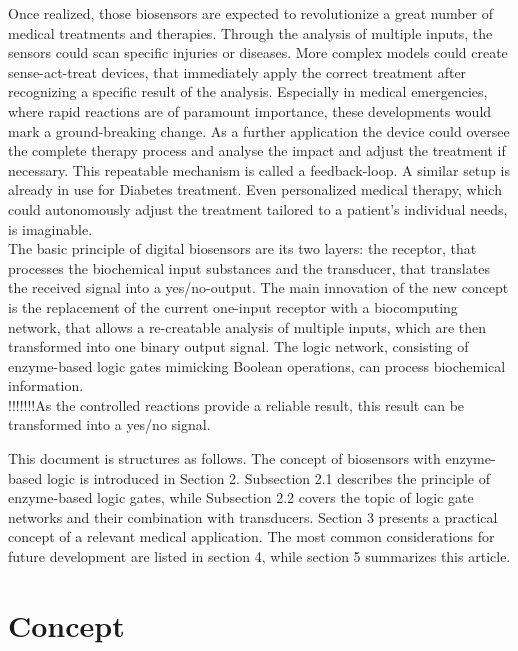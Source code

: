 \documentclass[runningheads]{llncs}
\begin{document}
	Once realized, those biosensors are expected to revolutionize a great number of medical treatments and therapies. Through the analysis of multiple inputs, the sensors could scan specific injuries or diseases. More complex models could create sense-act-treat devices, that immediately apply the correct treatment after recognizing a specific result of the analysis. Especially in medical emergencies, where rapid reactions are of paramount importance, these developments would mark a ground-breaking change. As a further application the device could oversee the complete therapy process and analyse the impact and adjust the treatment if necessary. This repeatable mechanism is called a feedback-loop. A similar setup is already in use for Diabetes treatment. Even personalized medical therapy, which could autonomously adjust the treatment tailored to a patient’s individual needs, is imaginable.\cite{original}\\
	
	The basic principle of digital biosensors are its two layers: the receptor, that processes the biochemical input substances and the transducer, that translates the received signal into a yes/no-output. The main innovation of the new concept is the replacement of the current one-input receptor with a biocomputing network, that allows a re-creatable analysis of multiple inputs, which are then transformed into one binary output signal. The logic network, consisting of enzyme-based logic gates mimicking Boolean operations, can process biochemical information.\cite{state of the art}\\ 
	 
	!!!!!!!As the controlled reactions provide a reliable result, this result can be transformed into a yes/no signal.
	
	This document is structures as follows. The concept of biosensors with enzyme-based logic is introduced in Section 2. Subsection 2.1 describes the principle of enzyme-based logic gates, while Subsection 2.2 covers the topic of logic gate networks and their combination with transducers. Section 3 presents a practical concept of a relevant medical application. The most common considerations for future development are listed in section 4, while section 5 summarizes this article.
	
	
	
	
	
\section{Concept}
\end{document}
